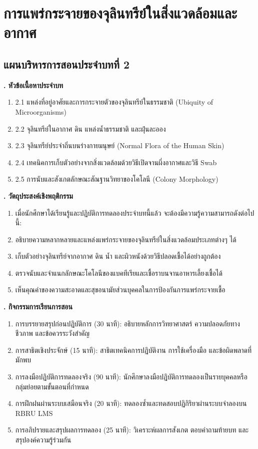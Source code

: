 \chapter{การแพร่กระจายของจุลินทรีย์ในสิ่งแวดล้อมและอากาศ}
\label{chap:ch02}

\section*{แผนบริหารการสอนประจำบทที่ 2}

\noindent\textbf{. หัวข้อเนื้อหาประจำบท}

\begin{enumerate}
    \item 2.1 แหล่งที่อยู่อาศัยและการกระจายตัวของจุลินทรีย์ในธรรมชาติ (Ubiquity of Microorganisms)
    \item 2.2 จุลินทรีย์ในอากาศ ดิน แหล่งน้ำธรรมชาติ และฝุ่นละออง
    \item 2.3 จุลินทรีย์ประจำถิ่นบนร่างกายมนุษย์ (Normal Flora of the Human Skin)
    \item 2.4 เทคนิคการเก็บตัวอย่างจากสิ่งแวดล้อมด้วยวิธีเปิดจานผึ่งอากาศและวิธี Swab
    \item 2.5 การนับและสังเกตลักษณะสัณฐานวิทยาของโคโลนี (Colony Morphology)
\end{enumerate}

\noindent\textbf{. วัตถุประสงค์เชิงพฤติกรรม}

\begin{enumerate}
    \item เมื่อนักศึกษาได้เรียนรู้และปฏิบัติการทดลองประจำบทนี้แล้ว จะต้องมีความรู้ความสามารถดังต่อไปนี้:
    \item อธิบายความหลากหลายและแหล่งแพร่กระจายของจุลินทรีย์ในสิ่งแวดล้อมประเภทต่างๆ ได้
    \item เก็บตัวอย่างจุลินทรีย์จากอากาศ ดิน น้ำ และผิวหนังด้วยวิธีปลอดเชื้อได้อย่างถูกต้อง
    \item ตรวจนับและจำแนกลักษณะโคโลนีของแบคทีเรียและเชื้อราบนจานอาหารเลี้ยงเชื้อได้
    \item เห็นคุณค่าของความสะอาดและสุขอนามัยส่วนบุคคลในการป้องกันการแพร่กระจายเชื้อ
\end{enumerate}

\noindent\textbf{. กิจกรรมการเรียนการสอน}

\begin{enumerate}
    \item การบรรยายสรุปก่อนปฏิบัติการ (30 นาที): อธิบายหลักการวิทยาศาสตร์ ความปลอดภัยทางชีวภาพ และข้อควรระวังสำคัญ
    \item การสาธิตเชิงประจักษ์ (15 นาที): สาธิตเทคนิคการปฏิบัติงาน การใช้เครื่องมือ และข้อผิดพลาดที่มักพบ
    \item การลงมือปฏิบัติการทดลองจริง (90 นาที): นักศึกษาลงมือปฏิบัติการทดลองเป็นรายบุคคลหรือกลุ่มย่อยตามขั้นตอนที่กำหนด
    \item การฝึกฝนผ่านระบบเสมือนจริง (20 นาที): ทดลองซ้ำและทดสอบปฏิกิริยาผ่านระบบจำลองบน RBRU LMS
    \item การอภิปรายและสรุปผลการทดลอง (25 นาที): วิเคราะห์ผลการสังเกต ตอบคำถามท้ายบท และสรุปองค์ความรู้ร่วมกัน
\end{enumerate}

